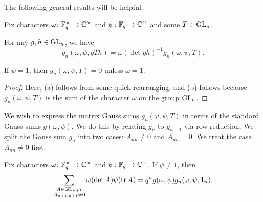 The following general results will be helpful.
\begin{lemma} \label{lem:gsum-gl-basic}
    Fix characters $\omega\colon\mathbb F_q^\times\to\mathbb C^\times$ and $\psi\colon\mathbb F_q\to\mathbb C^\times$ and some $T\in\mathrm{GL}_n$.
    \begin{listalph}
        \item For any $g,h\in\mathrm{GL}_n$, we have
        \[g_n(\omega,\psi,gTh)=\omega(\det gh)^{-1}g_n(\omega,\psi,T).\]
        \item If $\psi=1$, then $g_n(\omega,\psi,T)=0$ unless $\omega=1$.
    \end{listalph}
\end{lemma}
\begin{proof}
    Here, (a) follows from some quick rearranging, and (b) follows because $g_n(\omega,\psi,T)$ is the sum of the character $\omega$ on the group $\mathrm{GL}_n$.
\end{proof}
We wish to express the matrix Gauss sums $g_n(\omega, \psi, T)$ in terms of the standard Gauss sums $g(\omega,\psi)$. We do this by relating $g_n$ to $g_{n-1}$ via row-reduction. We split the Gauss sum $g_n$ into two cases: $A_{nn}\ne0$ and $A_{nn}=0$. We treat the case $A_{nn}\neq0$ first.
\begin{lemma} \label{lem:gsum-gl-not-0}
    Fix characters $\omega\colon\mathbb F_q^\times\to\mathbb C^\times$ and $\psi\colon\mathbb F_q\to\mathbb C^\times$. If $\psi\ne1$, then
    \[\sum_{\substack{A\in\mathrm{GL}_{n+1}\\A_{n+1,n+1}\ne0}}\omega(\det A)\psi(\operatorname{tr} A)=q^ng(\omega,\psi)g_n(\omega,\psi,1_n).\]
\end{lemma}
